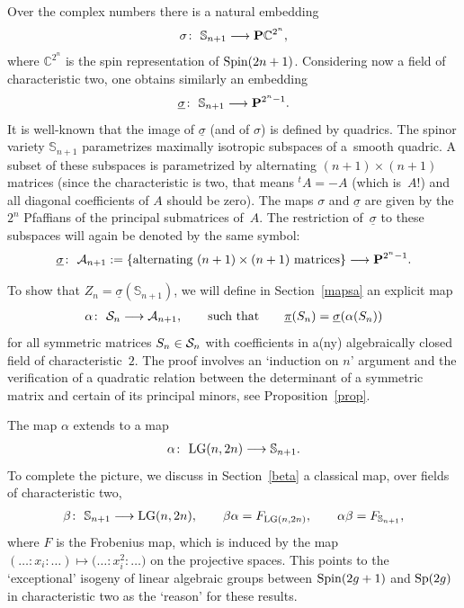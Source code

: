 \documentclass[pdftex]{sigma}
\newcommand{\CC}{{\mathbb C}}
\newcommand{\PP}{{\bf P}}
\newcommand{\bS}{{\mathbb S}}
\newcommand{\cA}{{\cal A}}
\newcommand{\cS}{{\cal S}}
\numberwithin{equation}{section}
\begin{document}
Over the complex numbers there is a natural embedding
\begin{gather*}
\sigma\colon \ \bS_{n+1} \longrightarrow \PP \CC^{2^n},
\end{gather*}
where $\CC^{2^n}$ is the spin representation of ${\rm Spin}(2n+1)$. Considering now a field of characteristic two, one obtains similarly an embedding
\begin{gather*}
\underline{\sigma}\colon \ \bS_{n+1} \longrightarrow \PP^{2^n-1}.
\end{gather*}
It is well-known that the image of $\underline{\sigma}$ (and of $\sigma$) is defined by quadrics. The spinor variety $\bS_{n+1}$ parametrizes maximally isotropic subspaces of a~smooth quadric. A subset of these subspaces is parametrized by alternating $(n+1)\times(n+1)$ matrices (since the characteristic is two, that means ${}^tA=-A$ (which is~$A$!) and all diagonal coefficients of $A$ should be zero). The maps $\sigma$ and $\underline{\sigma}$ are given by the $2^n$ Pfaffians of the principal submatrices of~$A$. The restriction of~$\underline{\sigma}$ to these subspaces will again be denoted by the same symbol:
\begin{gather*}
\underline{\sigma}\colon \ \cA_{n+1} := \{\text{alternating} \ (n+1)\times (n+1) \ \text{matrices} \} \longrightarrow \PP^{2^n-1}.
\end{gather*}

To show that $Z_n=\underline{\sigma}(\bS_{n+1})$, we will define in Section~\ref{mapsa}
an explicit map
\begin{gather*}
\alpha\colon \ \cS_n \longrightarrow \cA_{n+1},\qquad\text{such that}\qquad \underline{\pi}(S_n) = \underline{\sigma}(\alpha(S_n))
\end{gather*}
for all symmetric matrices $S_n\in \cS_n$ with coefficients in a(ny) algebraically closed field of characteristic~$2$. The proof involves an `induction on $n$' argument and the verification of a quadratic relation between the determinant of a symmetric matrix and certain of its principal minors, see Proposition~\ref{prop}.

The map $\alpha$ extends to a map
\begin{gather*}
\alpha\colon \ {\rm LG}(n,2n) \longrightarrow \bS_{n+1}.
\end{gather*}
To complete the picture, we discuss in Section~\ref{beta} a classical map, over fields of characteristic two,
\begin{gather*}
\beta\colon \ \bS_{n+1} \longrightarrow {\rm LG}(n,2n),\qquad \beta\alpha = F_{{\rm LG}(n,2n)},\qquad \alpha\beta = F_{\bS_{n+1}},
\end{gather*}
where $F$ is the Frobenius map, which is induced by the map $(\ldots:x_i:\ldots)\mapsto \big(\ldots:x_i^2:\ldots\big)$ on the projective spaces. This points to the `exceptional' isogeny of linear algebraic groups between ${\rm Spin}(2g+1)$ and ${\rm Sp}(2g)$ in characteristic two as the `reason' for these results.
\end{document}
